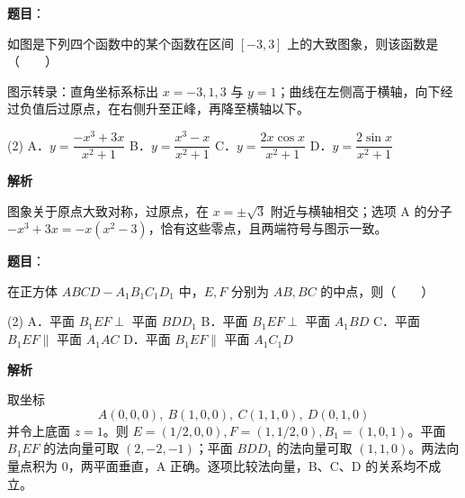 \begin{answer}

\textbf{题目}：

如图是下列四个函数中的某个函数在区间 $[-3,3]$ 上的大致图象，则该函数是\mbox{（　　）}

图示转录：直角坐标系标出 $x=-3,1,3$ 与 $y=1$；曲线在左侧高于横轴，向下经过负值后过原点，在右侧升至正峰，再降至横轴以下。
\nopagebreak[4]
\begin{center}\end{center}
\nopagebreak[4]
\begin{gkopts}(2)
\task A．$y=\dfrac{-x^3+3x}{x^2+1}$
\task B．$y=\dfrac{x^3-x}{x^2+1}$
\task C．$y=\dfrac{2x\cos x}{x^2+1}$
\task D．$y=\dfrac{2\sin x}{x^2+1}$
\end{gkopts}

\textbf{解析}

图象关于原点大致对称，过原点，在 $x=\pm\sqrt3$ 附近与横轴相交；选项 A 的分子 $-x^3+3x=-x(x^2-3)$，恰有这些零点，且两端符号与图示一致。


\end{answer}
\begin{answer}

\textbf{题目}：

在正方体 $ABCD-A_1B_1C_1D_1$ 中，$E,F$ 分别为 $AB,BC$ 的中点，则\mbox{（　　）}

\begin{gkopts}(2)
\task A．平面 $B_1EF\perp$ 平面 $BDD_1$
\task B．平面 $B_1EF\perp$ 平面 $A_1BD$
\task C．平面 $B_1EF\parallel$ 平面 $A_1AC$
\task D．平面 $B_1EF\parallel$ 平面 $A_1C_1D$
\end{gkopts}

\textbf{解析}

取坐标
\nopagebreak[4]
\[
A(0,0,0),\ B(1,0,0),\ C(1,1,0),\ D(0,1,0)
\]
并令上底面 $z=1$。则 $E=(1/2,0,0),F=(1,1/2,0),B_1=(1,0,1)$。平面 $B_1EF$ 的法向量可取 $(2,-2,-1)$；平面 $BDD_1$ 的法向量可取 $(1,1,0)$。两法向量点积为 $0$，两平面垂直，A 正确。逐项比较法向量，B、C、D 的关系均不成立。


\end{answer}
